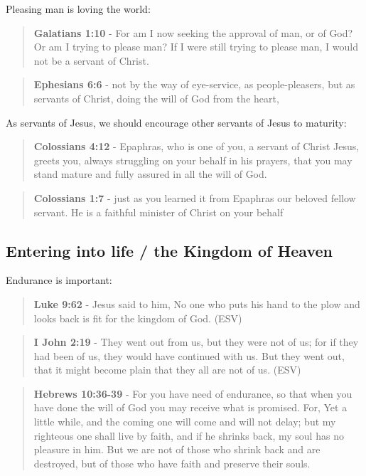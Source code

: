\documentclass[11pt]{article}
\begin{document}
Pleasing man is loving the world:

\begin{quote}
\textbf{Galatians 1:10} - For am I now seeking the approval of man, or of God? Or am I trying to please man? If I were still trying to please man, I would not be a servant of Christ.
\end{quote}

\begin{quote}
\textbf{Ephesians 6:6} - not by the way of eye-service, as people-pleasers, but as servants of Christ, doing the will of God from the heart,
\end{quote}

As servants of Jesus, we should encourage other servants of Jesus to maturity:

\begin{quote}
\textbf{Colossians 4:12} - Epaphras, who is one of you, a servant of Christ Jesus, greets you, always struggling on your behalf in his prayers, that you may stand mature and fully assured in all the will of God.
\end{quote}

\begin{quote}
\textbf{Colossians 1:7} - just as you learned it from Epaphras our beloved fellow servant. He is a faithful minister of Christ on your behalf
\end{quote}

\subsection{Entering into life / the Kingdom of Heaven}
\label{sec:org4c9e477}
Endurance is important:

\begin{quote}
\textbf{Luke 9:62} - Jesus said to him, No one who puts his hand to the plow and looks back is fit for the kingdom of God. (ESV)
\end{quote}

\begin{quote}
\textbf{I John 2:19} - They went out from us, but they were not of us; for if they had been of us, they would have continued with us. But they went out, that it might become plain that they all are not of us. (ESV)
\end{quote}

\begin{quote}
\textbf{Hebrews 10:36-39} - For you have need of endurance, so that when you have done the will of God you may receive what is promised. For, Yet a little while, and the coming one will come and will not delay; but my righteous one shall live by faith, and if he shrinks back, my soul has no pleasure in him. But we are not of those who shrink back and are destroyed, but of those who have faith and preserve their souls.
\end{quote}
\end{document}
